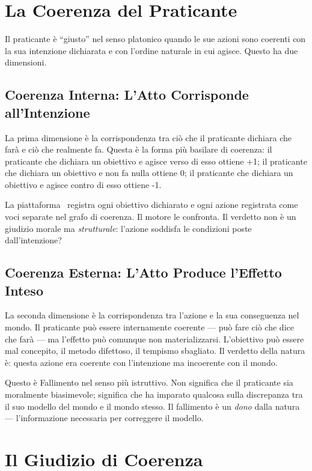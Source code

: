 \section{La Coerenza del Praticante}

Il praticante \`e ``giusto'' nel senso platonico quando le sue azioni
sono coerenti con la sua intenzione dichiarata e con l'ordine naturale
in cui agisce. Questo ha due dimensioni.

\subsection{Coerenza Interna: L'Atto Corrisponde all'Intenzione}

La prima dimensione \`e la corrispondenza tra ci\`o che il praticante
dichiara che far\`a e ci\`o che realmente fa. Questa \`e la forma pi\`u
basilare di coerenza: il praticante che dichiara un obiettivo e agisce
verso di esso ottiene +1; il praticante che dichiara un obiettivo e non
fa nulla ottiene 0; il praticante che dichiara un obiettivo e agisce
contro di esso ottiene -1.

La piattaforma \praxis\ registra ogni obiettivo dichiarato e ogni
azione registrata come voci separate nel grafo di coerenza. Il motore
le confronta. Il verdetto non \`e un giudizio morale ma \emph{strutturale}:
l'azione soddisfa le condizioni poste dall'intenzione?

\subsection{Coerenza Esterna: L'Atto Produce l'Effetto Inteso}

La seconda dimensione \`e la corrispondenza tra l'azione e la sua
conseguenza nel mondo. Il praticante pu\`o essere internamente coerente
--- pu\`o fare ci\`o che dice che far\`a --- ma l'effetto pu\`o comunque
non materializzarsi. L'obiettivo pu\`o essere mal concepito, il metodo
difettoso, il tempismo sbagliato. Il verdetto della natura \`e: questa
azione era coerente con l'intenzione ma incoerente con il mondo.

Questo \`e Fallimento nel senso pi\`u istruttivo. Non significa che il
praticante sia moralmente biasimevole; significa che ha imparato qualcosa
sulla discrepanza tra il suo modello del mondo e il mondo stesso. Il
fallimento \`e un \emph{dono} dalla natura --- l'informazione necessaria
per correggere il modello.

\section{Il Giudizio di Coerenza}

